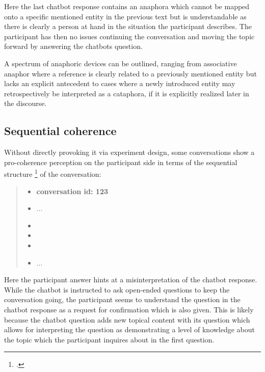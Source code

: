     Here the last chatbot response contains an anaphora which
    cannot be mapped onto a specific mentioned entity in the previous text
    but is understandable as there is clearly a person at hand in the situation the participant describes.
    The participant has then no issues continuing the conversation and
    moving the topic forward by answering the chatbots question.

    A spectrum of anaphoric devices can be outlined,
    ranging from associative anaphor
    where a reference is clearly related to a previously mentioned entity
    but lacks an explicit antecedent
    to cases where a newly introduced entity may retrospectively be interpreted as a cataphora,
    if it is explicitly realized later in the discourse.

\subsection{Sequential coherence}

Without directly provoking it via experiment design,
some conversations show a pro-coherence perception on the participant side
in terms of the sequential structure \footcite{schegloff1996turn} of the conversation:


    \begin{quote}
    \begin{itemize}[label={}, leftmargin=0pt, itemsep=0.5em]
    \item \textbf{conversation id: 123}
    \item ...
    \item {}
    \item {}
    \item {}
    \item ...
    \end{itemize}
    \end{quote}

Here the participant answer hints at a misinterpretation of the chatbot response.
While the chatbot is instructed to ask open-ended questions to keep the conversation going,
the participant seems to understand the question in the chatbot response
as a request for confirmation which is also given.
This is likely because the chatbot question adds new topical content with its question
which allows for interpreting the question as demonstrating a level of knowledge about the topic
which the participant inquires about in the first question.

